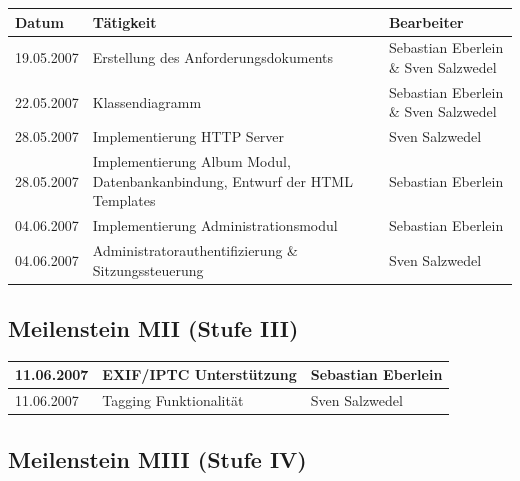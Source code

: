\documentclass[a4paper,12pt,liststotocnumbered]{scrartcl}
\begin{document}
\begin{tabularx}{\textwidth}{|l|X|X|}

	\hline

	\textbf{Datum}&\textbf{Tätigkeit}&\textbf{Bearbeiter}\\

	\hline

	19.05.2007&Erstellung des Anforderungsdokuments&Sebastian Eberlein \&
	Sven Salzwedel\\

	\hline 
	
	22.05.2007&Klassendiagramm&Sebastian Eberlein \& Sven Salzwedel\\

	\hline

	28.05.2007&Implementierung HTTP Server&Sven Salzwedel\\

	\hline

	28.05.2007&Implementierung Album Modul, Datenbankanbindung, Entwurf
	der HTML Templates&Sebastian Eberlein\\
	
	\hline

	04.06.2007&Implementierung Administrationsmodul&Sebastian Eberlein\\

	\hline

	04.06.2007&Administratorauthentifizierung \& Sitzungssteuerung&Sven
	Salzwedel\\

	\hline

\end{tabularx}

\subsection{Meilenstein MII (Stufe III)}

\begin{tabularx}{\textwidth}{|l|X|X|}

	\hline

	11.06.2007&EXIF/IPTC Unterstützung&Sebastian Eberlein\\

	\hline

	11.06.2007&Tagging Funktionalität&Sven Salzwedel\\

	\hline

\end{tabularx}

\subsection{Meilenstein MIII (Stufe IV)}
\end{document}
